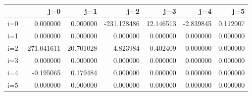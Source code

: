\begin{tabular}{lrrrrrr}
\toprule
{} &         j=0 &        j=1 &         j=2 &        j=3 &       j=4 &       j=5 \\
\midrule
i=0 &    0.000000 &   0.000000 & -231.128486 &  12.146513 & -2.839845 &  0.112007 \\
i=1 &    0.000000 &   0.000000 &    0.000000 &   0.000000 &  0.000000 &  0.000000 \\
i=2 & -271.041611 &  20.701028 &   -4.823984 &   0.402409 &  0.000000 &  0.000000 \\
i=3 &    0.000000 &   0.000000 &    0.000000 &   0.000000 &  0.000000 &  0.000000 \\
i=4 &   -0.195065 &   0.179484 &    0.000000 &   0.000000 &  0.000000 &  0.000000 \\
i=5 &    0.000000 &   0.000000 &    0.000000 &   0.000000 &  0.000000 &  0.000000 \\
\bottomrule
\end{tabular}
